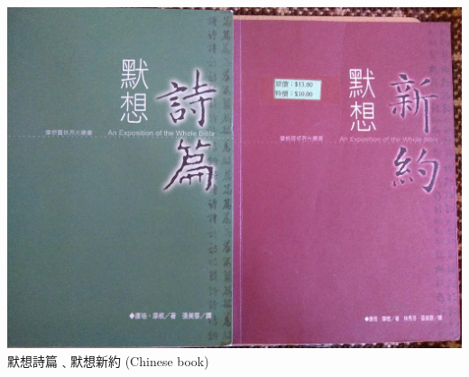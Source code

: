 \documentclass[t]{beamer}
\newcommand{\htarget}[2]{\hypertarget{#1}{#2}}
\begin{document}
\begin{frame}\htarget{psalm}{} \begin{center}
\includegraphics[height=0.8\textheight]{book06_mini.jpg} \\
默想詩篇﹑默想新約 (Chinese book)
\end{center} \end{frame}
\end{document}
